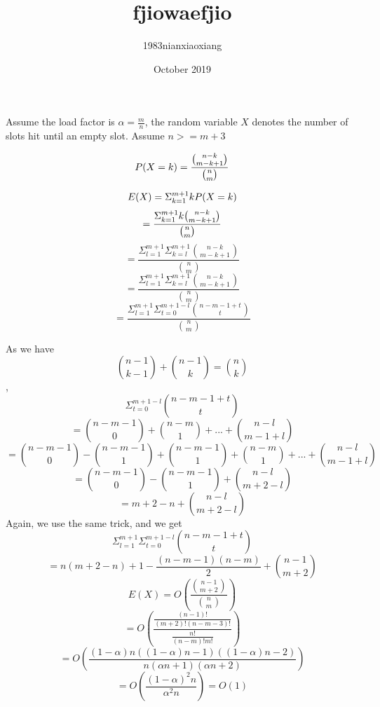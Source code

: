 \documentclass{article}
\title{fjiowaefjio}
\author{1983nianxiaoxiang}
\date{October 2019}
\begin{document}
\large
Assume the load factor is $ \alpha = \frac{m}{n} $, the random variable $X$ denotes the number of slots hit until an empty slot.
Assume $n >= m+3$

$$P(X = k) = \frac{\binom{n-k}{m-k+1}}{\binom{n}{m}}\\ $$

$$E(X) = \Sigma_{k = 1}^{m + 1} kP(X = k)\\$$
$$= \frac{\Sigma_{k = 1}^{m+1}k\binom{n-k}{m-k+1}}{\binom{n}{m}}\\$$
$$= \frac{\Sigma_{l = 1}^{m+1}\Sigma_{k = l}^{m+1}\binom{n-k}{m-k+1}}{\binom{n}{m}}$$
$$= \frac{\Sigma_{l = 1}^{m+1}\Sigma_{k = l}^{m+1}\binom{n-k}{m-k+1}}{\binom{n}{m}}$$
$$= \frac{\Sigma_{l = 1}^{m+1}\Sigma_{t = 0}^{m+1-l}\binom{n-m-1+t}{t}}{\binom{n}{m}}$$   

As we have $$\binom{n-1}{k-1} + \binom{n-1}{k} = \binom{n}{k}$$,
$$\Sigma_{t = 0}^{m+1-l}\binom{n-m-1+t}{t}$$
$$= \binom{n-m-1}{0} + \binom{n-m}{1} + ... + \binom{n-l}{m-1+l}$$
$$= \binom{n-m-1}{0} - \binom{n-m-1}{1} + \binom{n-m-1}{1} + \binom{n-m}{1} + ... + \binom{n-l}{m-1+l}$$
$$= \binom{n-m-1}{0} - \binom{n-m-1}{1} + \binom{n-l}{m+2-l}$$
$$= m+2-n + \binom{n-l}{m+2-l}$$
Again, we use the same trick, and we get
$$\Sigma_{l = 1}^{m+1}\Sigma_{t = 0}^{m+1-l}\binom{n-m-1+t}{t}$$  
$$ = n(m+2-n)+1-\frac{(n-m-1)(n-m)}{2}+\binom{n-1}{m+2}$$
$$ E(X) = O(\frac{\binom{n-1}{m+2}}{\binom{n}{m}})$$
$$=O(\frac{\frac{(n-1)!}{(m+2)!(n-m-3)!}}{\frac{n!}{(n-m)!m!}})$$
$$=O(\frac{(1-\alpha)n((1-\alpha)n-1)((1-\alpha)n-2)}{n(\alpha n+1)(\alpha n+2)})$$
$$=O(\frac{(1-\alpha)^{2}n}{\alpha^{2} n}) = O(1)$$
\end{document}
